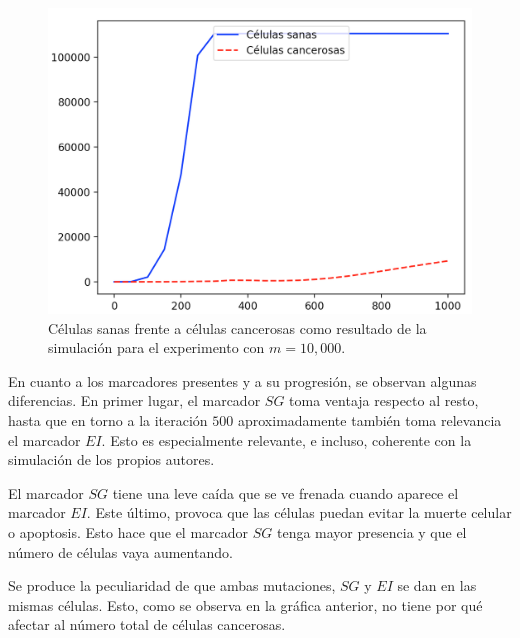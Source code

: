 \begin{figure}[h]
\centering
\includegraphics[scale=0.6]{figures/experiments/exp1/healthvscarcino}
\caption{Células sanas frente a células cancerosas como resultado de la simulación para el experimento con $m = 10,000$.}
\end{figure}

En cuanto a los marcadores presentes y a su progresión, se observan algunas diferencias. En primer lugar, el marcador
$SG$ toma ventaja respecto al resto, hasta que en torno a la iteración $500$ aproximadamente
también toma relevancia el marcador $EI$. Esto es especialmente relevante, e incluso, coherente con la simulación de los
propios autores.

El marcador $SG$ tiene una leve caída que se ve frenada cuando aparece el marcador $EI$. Este último, provoca
que las células puedan evitar la muerte celular o apoptosis. Esto hace que el marcador $SG$ tenga mayor presencia
y que el número de células vaya aumentando.

Se produce la peculiaridad de que ambas mutaciones, $SG$ y $EI$ se dan en las mismas células. Esto, como se observa
en la gráfica anterior, no tiene por qué afectar al número total de células cancerosas.

